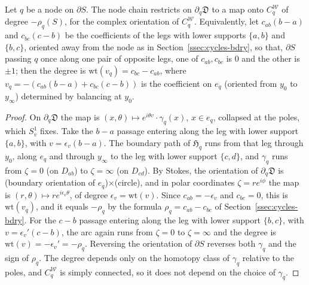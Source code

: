 \begin{lemma}\label{lem:nodedeg}
Let $q$ be a node on $\partial S$. The node chain restricts on $\partial_q\mathfrak D$ to a map onto $C^{\mathscr W}_q$ of degree
$-\rho_q(S)$, for the complex orientation of $C^{\mathscr W}_q$. Equivalently, let $c_{ab}(b-a)$ and $c_{bc}(c-b)$ be the coefficients of
the legs with lower supports $\{a,b\}$ and $\{b,c\}$, oriented away from the node as in Section~\ref{ssec:cycles-bdry}, so
that, $\partial S$ passing $q$ once along one pair of opposite legs, one of $c_{ab},c_{bc}$ is $0$ and the other is $\pm1$;
then the degree is $\mathrm{wt}(v_q)=c_{bc}-c_{ab}$, where $v_q=-(c_{ab}(b-a)+c_{bc}(c-b))$ is the coefficient on $e_q$
(oriented from $y_0$ to $y_\infty$) determined by balancing at $y_0$.
\end{lemma}
\begin{proof}
On $\partial_q\mathfrak D$ the map is $(x,\theta)\mapsto e^{i\theta v}\cdot\gamma_q(x)$, $x\in e_q$, collapsed at the poles,
which $S^1_v$ fixes. Take the $b-a$ passage entering along the leg with lower support $\{a,b\}$, with $v=\epsilon_v(b-a)$. The
boundary path of $\mathfrak H_q$ runs from that leg through $y_0$, along $e_q$ and through $y_\infty$ to the leg with lower
support $\{c,d\}$, and $\gamma_q$ runs from $\zeta=0$ (on $D_{ab}$) to $\zeta=\infty$ (on $D_{cd}$). By Stokes, the orientation of
$\partial_q\mathfrak D$ is (boundary orientation of $e_q$)$\times$(circle), and in polar coordinates $\zeta=re^{i\phi}$ the map is
$(r,\theta)\mapsto re^{i\epsilon_v\theta}$, of degree $\epsilon_v=\mathrm{wt}(v)$. Since $c_{ab}=-\epsilon_v$ and $c_{bc}=0$, this is
$\mathrm{wt}(v_q)$, and it equals $-\rho_q$ by the formula $\rho_q=c_{ab}-c_{bc}$ of Section~\ref{ssec:cycles-bdry}. For the
$c-b$ passage entering along the leg with lower support $\{b,c\}$, with $v=\epsilon_v'(c-b)$, the arc again runs from $\zeta=0$ to
$\zeta=\infty$ and the degree is $\mathrm{wt}(v)=-\epsilon_v'=-\rho_q$. Reversing the orientation of $\partial S$ reverses both
$\gamma_q$ and the sign of $\rho_q$. The degree depends only on the homotopy class of $\gamma_q$ relative to the poles, and
$C^{\mathscr W}_q$ is simply connected, so it does not depend on the choice of $\gamma_q$.
\end{proof}

